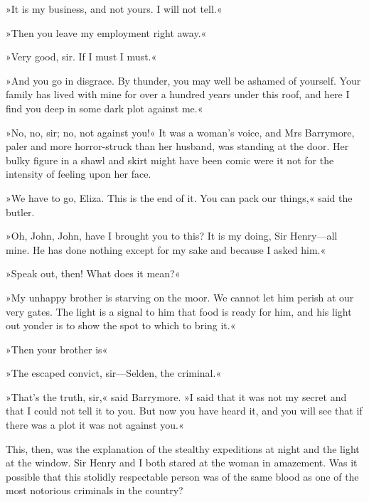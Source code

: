 »It is my business, and not yours. I will not tell.«

»Then you leave my employment right away.«

»Very good, sir. If I must I must.«

»And you go in disgrace. By thunder, you may well be ashamed of yourself. Your family has lived with mine for over a hundred years under this roof, and here I find you deep in some dark plot against me.«

»No, no, sir; no, not against you!« It was a woman's voice, and Mrs Barrymore, paler and more horror-struck than her husband, was standing at the door. Her bulky figure in a shawl and skirt might have been comic were it not for the intensity of feeling upon her face.

»We have to go, Eliza. This is the end of it. You can pack our things,« said the butler.

»Oh, John, John, have I brought you to this? It is my doing, Sir Henry\allowbreak---\allowbreak all mine. He has done nothing except for my sake and because I asked him.«

»Speak out, then! What does it mean?«

»My unhappy brother is starving on the moor. We cannot let him perish at our very gates. The light is a signal to him that food is ready for him, and his light out yonder is to show the spot to which to bring it.«

»Then your brother is\longdash «

»The escaped convict, sir\allowbreak---\allowbreak Selden, the criminal.«

»That's the truth, sir,« said Barrymore. »I said that it was not my secret and that I could not tell it to you. But now you have heard it, and you will see that if there was a plot it was not against you.«

This, then, was the explanation of the stealthy expeditions at night and the light at the window. Sir Henry and I both stared at the woman in amazement. Was it possible that this stolidly respectable person was of the same blood as one of the most notorious criminals in the country?

